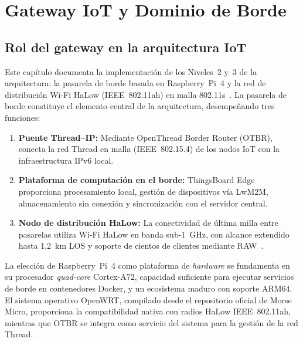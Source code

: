 \chapter[Gateway IoT y Dominio de Borde]{Gateway IoT y Dominio de Borde}
\label{chap:gateway-halow}


\section{Rol del gateway en la arquitectura IoT}
\label{sec:gateway-rol}

Este capítulo documenta la implementación de los Niveles~2 y~3 de la arquitectura: la pasarela de borde basada en Raspberry~Pi~4 y la red de distribución Wi-Fi HaLow (IEEE~802.11ah) en malla 802.11s~\cite{qiaoSurveyWiFiHaLow2018}.  La pasarela de borde constituye el elemento central de la arquitectura, desempeñando tres funciones:

\begin{enumerate}
    \item \textbf{Puente Thread--IP:} Mediante OpenThread Border Router (OTBR), conecta la red Thread en malla (IEEE~802.15.4) de los nodos IoT con la infraestructura IPv6 local.
    \item \textbf{Plataforma de computación en el borde:} ThingsBoard Edge proporciona procesamiento local, gestión de dispositivos vía LwM2M, almacenamiento sin conexión y sincronización con el servidor central.
    \item \textbf{Nodo de distribución HaLow:} La conectividad de última milla entre pasarelas utiliza Wi-Fi HaLow en banda sub-1~GHz, con alcance extendido hasta 1,2~km LOS y soporte de cientos de clientes mediante RAW~\cite{leeWiFiHaLowLongRange2021, kimIEEE80211ahHaLow2021}.
\end{enumerate}

La elección de Raspberry~Pi~4 como plataforma de \emph{hardware} se fundamenta en su procesador \emph{quad-core} Cortex-A72, capacidad suficiente para ejecutar servicios de borde en contenedores Docker, y un ecosistema maduro con soporte ARM64.  El sistema operativo OpenWRT, compilado desde el repositorio oficial de Morse Micro, proporciona la compatibilidad nativa con radios HaLow IEEE~802.11ah, mientras que OTBR se integra como servicio del sistema para la gestión de la red Thread.

